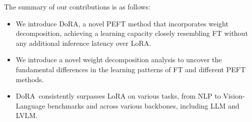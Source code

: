 \documentclass{article}
\newcommand{\ours}{DoRA}
\theoremstyle{plain}
\theoremstyle{definition}
\theoremstyle{remark}
\begin{document}
The summary of our contributions is as follows:
\begin{itemize}
\item We introduce \ours, a novel PEFT method that incorporates weight decomposition, achieving a learning capacity closely resembling FT without any additional inference latency over LoRA.
\item We introduce a novel weight decomposition analysis to uncover the fundamental differences in the learning patterns of FT and different PEFT methods.
\item \ours~consistently surpasses LoRA on various tasks, from NLP to Vision-Language benchmarks and across various backbones, including LLM and LVLM.
\end{itemize}

\end{document}
